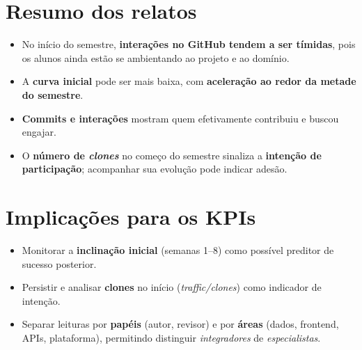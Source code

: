 \documentclass[
	12pt,
	openright,
	oneside,
	a4paper,
	brazil
]{abntex2}
\begin{document}
\begin{apendicesenv}
\section*{Resumo dos relatos}
\begin{itemize}
\item No início do semestre, \textbf{interações no GitHub tendem a ser tímidas}, pois os alunos ainda estão se ambientando ao projeto e ao domínio.
\item A \textbf{curva inicial} pode ser mais baixa, com \textbf{aceleração ao redor da metade do semestre}.
\item \textbf{Commits e interações} mostram quem efetivamente contribuiu e buscou engajar.
\item O \textbf{número de \textit{clones}} no começo do semestre sinaliza a \textbf{intenção de participação}; acompanhar sua evolução pode indicar adesão.
\end{itemize}

\section*{Implicações para os KPIs}
\begin{itemize}
\item Monitorar a \textbf{inclinação inicial} (semanas 1--8) como possível preditor de sucesso posterior.
\item Persistir e analisar \textbf{clones} no início (\emph{traffic/clones}) como indicador de intenção.
\item Separar leituras por \textbf{papéis} (autor, revisor) e por \textbf{áreas} (dados, frontend, APIs, plataforma), permitindo distinguir \textit{integradores} de \textit{especialistas}.
\end{itemize}

\end{apendicesenv}
\end{document}
